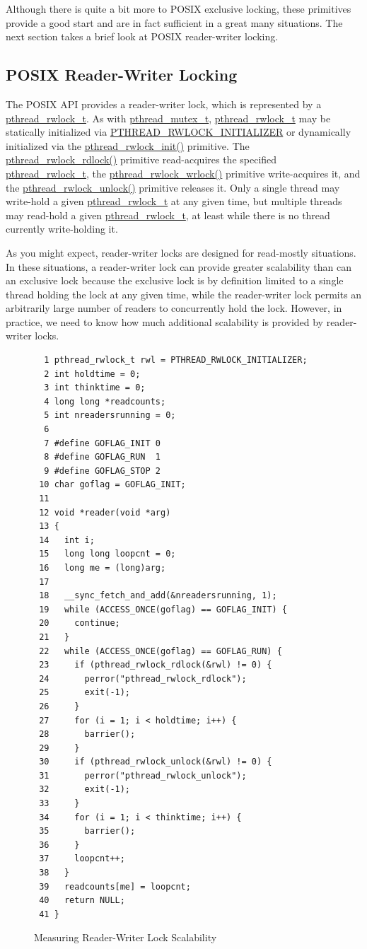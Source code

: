 Although there is quite a bit more to POSIX exclusive locking, these
primitives provide a good start and are in fact sufficient in a great
many situations.
The next section takes a brief look at POSIX reader-writer locking.

\subsection{POSIX Reader-Writer Locking}
\label{sec:toolsoftrade:POSIX Reader-Writer Locking}

The POSIX API provides a reader-writer lock, which is represented by
a \url{pthread_rwlock_t}.
As with \url{pthread_mutex_t}, \url{pthread_rwlock_t} may be statically
initialized via \url{PTHREAD_RWLOCK_INITIALIZER} or dynamically
initialized via the \url{pthread_rwlock_init()} primitive.
The \url{pthread_rwlock_rdlock()} primitive read-acquires the
specified \url{pthread_rwlock_t}, the \url{pthread_rwlock_wrlock()}
primitive write-acquires it, and the \url{pthread_rwlock_unlock()}
primitive releases it.
Only a single thread may write-hold a given \url{pthread_rwlock_t}
at any given time, but multiple threads may read-hold a given
\url{pthread_rwlock_t}, at least while there is no thread
currently write-holding it.

As you might expect, reader-writer locks are designed for read-mostly
situations.
In these situations, a reader-writer lock can provide greater scalability
than can an exclusive lock because the exclusive lock is by definition
limited to a single thread holding the lock at any given time, while
the reader-writer lock permits
an arbitrarily large number of readers to concurrently hold the lock.
However, in practice, we need to know how much additional scalability is
provided by reader-writer locks.

\begin{figure}[tbp]
{ \scriptsize
\begin{verbatim}
  1 pthread_rwlock_t rwl = PTHREAD_RWLOCK_INITIALIZER;
  2 int holdtime = 0;
  3 int thinktime = 0;
  4 long long *readcounts;
  5 int nreadersrunning = 0;
  6 
  7 #define GOFLAG_INIT 0
  8 #define GOFLAG_RUN  1
  9 #define GOFLAG_STOP 2
 10 char goflag = GOFLAG_INIT;
 11 
 12 void *reader(void *arg)
 13 {
 14   int i;
 15   long long loopcnt = 0;
 16   long me = (long)arg;
 17 
 18   __sync_fetch_and_add(&nreadersrunning, 1);
 19   while (ACCESS_ONCE(goflag) == GOFLAG_INIT) {
 20     continue;
 21   }
 22   while (ACCESS_ONCE(goflag) == GOFLAG_RUN) {
 23     if (pthread_rwlock_rdlock(&rwl) != 0) {
 24       perror("pthread_rwlock_rdlock");
 25       exit(-1);
 26     }
 27     for (i = 1; i < holdtime; i++) {
 28       barrier();
 29     }
 30     if (pthread_rwlock_unlock(&rwl) != 0) {
 31       perror("pthread_rwlock_unlock");
 32       exit(-1);
 33     }
 34     for (i = 1; i < thinktime; i++) {
 35       barrier();
 36     }
 37     loopcnt++;
 38   }
 39   readcounts[me] = loopcnt;
 40   return NULL;
 41 }
\end{verbatim}
}
\caption{Measuring Reader-Writer Lock Scalability}
\label{fig:toolsoftrade:Measuring Reader-Writer Lock Scalability}
\end{figure}

